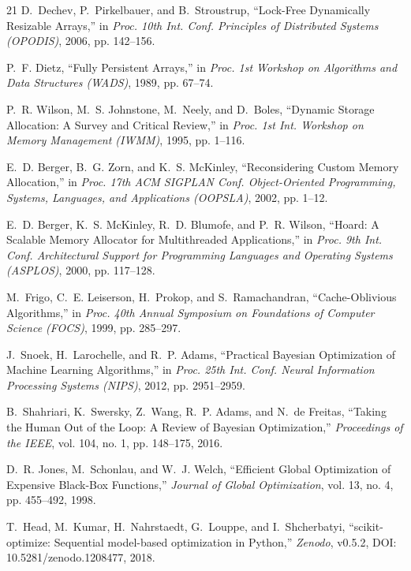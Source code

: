 \documentclass[conference]{IEEEtran}
\begin{document}
\begin{thebibliography}{21}
D.~Dechev, P.~Pirkelbauer, and B.~Stroustrup, ``Lock-Free Dynamically Resizable Arrays,'' in \emph{Proc. 10th Int. Conf. Principles of Distributed Systems (OPODIS)}, 2006, pp. 142--156.

P.~F. Dietz, ``Fully Persistent Arrays,'' in \emph{Proc. 1st Workshop on Algorithms and Data Structures (WADS)}, 1989, pp. 67--74.

P.~R. Wilson, M.~S. Johnstone, M.~Neely, and D.~Boles, ``Dynamic Storage Allocation: A Survey and Critical Review,'' in \emph{Proc. 1st Int. Workshop on Memory Management (IWMM)}, 1995, pp. 1--116.

E.~D. Berger, B.~G. Zorn, and K.~S. McKinley, ``Reconsidering Custom Memory Allocation,'' in \emph{Proc. 17th ACM SIGPLAN Conf. Object-Oriented Programming, Systems, Languages, and Applications (OOPSLA)}, 2002, pp. 1--12.

E.~D. Berger, K.~S. McKinley, R.~D. Blumofe, and P.~R. Wilson, ``Hoard: A Scalable Memory Allocator for Multithreaded Applications,'' in \emph{Proc. 9th Int. Conf. Architectural Support for Programming Languages and Operating Systems (ASPLOS)}, 2000, pp. 117--128.

M.~Frigo, C.~E. Leiserson, H.~Prokop, and S.~Ramachandran, ``Cache-Oblivious Algorithms,'' in \emph{Proc. 40th Annual Symposium on Foundations of Computer Science (FOCS)}, 1999, pp. 285--297.

J.~Snoek, H.~Larochelle, and R.~P. Adams, ``Practical Bayesian Optimization of Machine Learning Algorithms,'' in \emph{Proc. 25th Int. Conf. Neural Information Processing Systems (NIPS)}, 2012, pp. 2951--2959.

B.~Shahriari, K.~Swersky, Z.~Wang, R.~P. Adams, and N.~de Freitas, ``Taking the Human Out of the Loop: A Review of Bayesian Optimization,'' \emph{Proceedings of the IEEE}, vol. 104, no. 1, pp. 148--175, 2016.

D.~R. Jones, M.~Schonlau, and W.~J. Welch, ``Efficient Global Optimization of Expensive Black-Box Functions,'' \emph{Journal of Global Optimization}, vol. 13, no. 4, pp. 455--492, 1998.

T.~Head, M.~Kumar, H.~Nahrstaedt, G.~Louppe, and I.~Shcherbatyi, ``scikit-optimize: Sequential model-based optimization in Python,'' \emph{Zenodo}, v0.5.2, DOI: 10.5281/zenodo.1208477, 2018.
\end{thebibliography}
\end{document}
